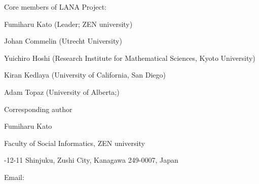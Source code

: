 \documentclass[12pt, reqno, a4paper]{amsart}
\begin{document}
\frenchspacing




\bigskip\bigskip\noindent
{\small
Core members of LANA Project:

\medskip\noindent
Fumiharu Kato (Leader; ZEN university)

\smallskip\noindent
Johan Commelin (Utrecht University)

\smallskip\noindent
Yuichiro Hoshi (Research Institute for Mathematical Sciences, Kyoto University)


\smallskip\noindent
Kiran Kedlaya (University of California, San Diego)

\smallskip\noindent
Adam Topaz (University of Alberta;)

\bigskip\bigskip\noindent
Corresponding author 

\medskip\noindent
Fumiharu Kato

\noindent
Faculty of Social Informatics, ZEN university

-12-11 Shinjuku, Zushi City, Kanagawa 249-0007, Japan

\noindent
Email: 
}
\end{document}
